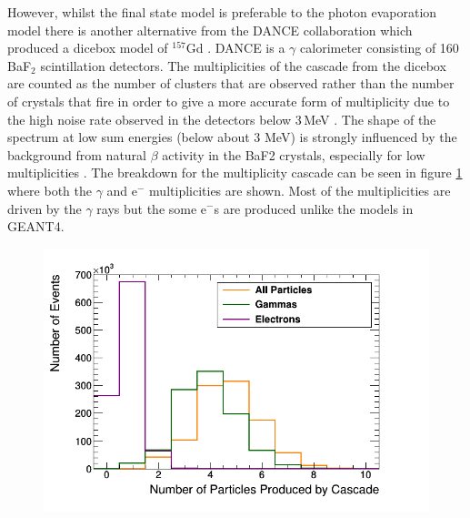 
However, whilst the final state model is preferable to the photon evaporation model there is another alternative from the DANCE collaboration which produced a dicebox model of $^{157}$Gd \cite{Chyzh_2011}. DANCE is a $\gamma$ calorimeter consisting of 160 BaF$_2$ scintillation detectors. The multiplicities of the cascade from the dicebox are counted as the number of clusters that are observed rather than the number of crystals that fire in order to give a more accurate form of multiplicity due to the high noise rate observed in the detectors below 3\,MeV \cite{Chyzh_2011}. The shape of the spectrum at low sum energies (below about 3 MeV) is strongly influenced by the background from natural $\beta$ activity in the BaF2 crystals, especially for low multiplicities \cite{Chyzh_2011}. The breakdown for the multiplicity cascade can be seen in figure \ref{fig:gadoliniumMultipliciesBreakdownCascade} where both the $\gamma$ and e$^-$ multiplicities are shown. Most of the multiplicities are driven by the $\gamma$ rays but the some e$^-$s are produced unlike the models in GEANT4. 

\begin{figure}[htbp]
 \centering
 \includegraphics[width=0.7\linewidth]{Chapter4/Figs/Raster/gadolinium/gadoliniumMultipliciesBreakdownCascade.png}
 \label{fig:gadoliniumMultipliciesBreakdownCascade}
\end{figure}

